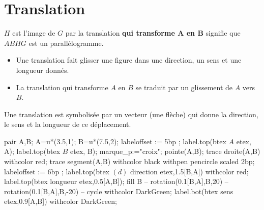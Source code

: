 \section{Translation}

\begin{minipage}{0.6\linewidth}
    \begin{definition}
        $H$ est l’image de $G$ par la translation \textbf{qui transforme $\mathbf{A}$ en $\mathbf{B}$} signifie que $ABHG$ est un parallélogramme.
    \end{definition}
\end{minipage}
\begin{minipage}{0.4\linewidth}
    \hspace*{-10mm}
\end{minipage}

\begin{remarques}
    \begin{itemize}
        \item Une translation fait glisser une figure dans une direction, un sens et une longueur donnés.
        \item La translation qui transforme $A$ en $B$ se traduit par un glissement de $A$ vers $B$.
    \end{itemize}
    \smallskip
\end{remarques}

\begin{notation}    
    Une translation est symbolisée par un vecteur (une flèche) qui donne la direction, le sens et la longueur de ce déplacement.
    
    \begin{Geometrie}[CoinHD={(11u,3u)}]
        pair A,B;
        A=u*(3.5,1);
        B=u*(7.5,2);
        labeloffset := 5bp ;
        label.top(btex $A$ etex, A);
        label.top(btex $B$ etex, B);
        marque_p:="croix";
        pointe(A,B);
        trace droite(A,B) withcolor red;
        trace segment(A,B) withcolor black withpen pencircle scaled 2bp;        
        labeloffset := 6bp ;
        label.top(btex $(d)$ direction etex,1.5[B,A]) withcolor red;
        label.top(btex longueur etex,0.5[A,B]);
        fill B -- rotation(0.1[B,A],B,20) -- rotation(0.1[B,A],B,-20) -- cycle withcolor DarkGreen;
        label.bot(btex sens etex,0.9[A,B]) withcolor DarkGreen;
    \end{Geometrie}    
\end{notation}


